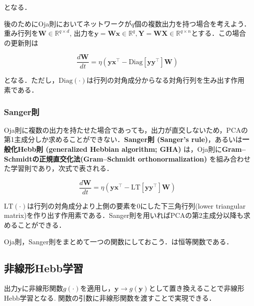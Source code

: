 となる．



後のためにOja則においてネットワークが$q$個の複数出力を持つ場合を考えよう．重み行列を$\mathbf{W} \in \mathbb{R}^{q\times d}$, 出力を$\mathbf{y}=\mathbf{W}\mathbf{x} \in \mathbb{R}^{q}, \mathbf{Y}=\mathbf{W}\mathbf{X} \in \mathbb{R}^{q\times n}$とする．この場合の更新則は


\begin{equation}
\frac{d\mathbf{W}}{dt} = \eta \left(\mathbf{y}\mathbf{x}^\top - \mathrm{Diag}\left[\mathbf{y}\mathbf{y}^\top\right] \mathbf{W}\right)
\end{equation}


となる．ただし，$\mathrm{Diag}(\cdot)$は行列の対角成分からなる対角行列を生み出す作用素である．
\subsubsection{Sanger則}
Oja則に複数の出力を持たせた場合であっても，出力が直交しないため，PCAの第1主成分しか求めることができない．\textbf{Sanger則 (Sanger's rule)}，あるいは\textbf{一般化Hebb則 (generalized Hebbian algorithm; GHA)} は，Oja則に\textbf{Gram–Schmidtの正規直交化法(Gram–Schmidt orthonormalization)} を組み合わせた学習則であり，次式で表される．


\begin{equation}
\frac{d\mathbf{W}}{dt} = \eta \left(\mathbf{y}\mathbf{x}^\top - \mathrm{LT}\left[\mathbf{y}\mathbf{y}^\top\right] \mathbf{W}\right)
\end{equation}


$\mathrm{LT}(\cdot)$は行列の対角成分より上側の要素を0にした下三角行列(lower triangular matrix)を作り出す作用素である．Sanger則を用いればPCAの第2主成分以降も求めることができる．



Oja則，Sanger則をまとめて一つの関数にしておこう．は恒等関数である．

\subsection{非線形Hebb学習}
出力$\mathbf{y}$に非線形関数$g(\cdot)$を適用し，$\mathbf{y}\to g(\mathbf{y})$として置き換えることで非線形Hebb学習となる\cite{Oja1997-hr}\cite{Brito2016-mx}. 関数の引数に非線形関数を渡すことで実現できる．

